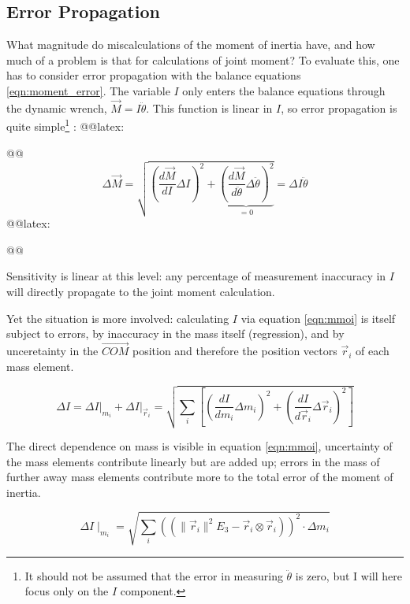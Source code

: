 \subsection{Error Propagation}
\label{sec:org0cb3045}
What magnitude do miscalculations of the moment of inertia have, and how much of a problem is that for calculations of joint moment?
To evaluate this, one has to consider error propagation \citep{Hughes2010,Arroyave2022,Myers2015} with the balance equations \eqref{eqn:moment_error}.
The variable \(I\) only enters the balance equations through the dynamic wrench, \(\vec{M} = I \ddot\theta\).
This function is linear in \(I\), so error propagation is quite simple\footnote{It should not be assumed that the error in measuring \(\ddot \theta\) is zero, but I will here focus only on the \(I\) component.} \citep{Normann2016}:
@@latex:\begin{change}@@
\begin{equation}\label{eqn:moment_error}
\Delta \vec{M} = \sqrt{\left(\frac{d \vec{M}}{d I}\Delta I\right)^2 + \underbrace{\left(\frac{d \vec{M}}{d \ddot \theta}\Delta \ddot \theta\right)^2}_{=0} } = \Delta I \ddot\theta
\end{equation}
@@latex:\end{change}@@


Sensitivity is linear at this level: any percentage of measurement inaccuracy in \(I\) will directly propagate to the joint moment calculation.


Yet the situation is more involved: calculating \(I\) via equation \eqref{eqn:mmoi} is itself subject to errors, by inaccuracy in the mass itself (regression), and by unceretainty in the \(\vec{COM}\) position and therefore the position vectors \(\vec{r}_{i}\) of each mass element.
\begin{change}
\[ \Delta I = \left. \Delta I \right|_{m_i} + \left. \Delta I \right|_{\vec{r}_i} = \sqrt{ \sum_{i} \left[ \left(\frac{d I}{d m_{i}} \Delta m_{i} \right)^2 + \left(\frac{d I}{d \vec{r}_{i}} \Delta \vec{r}_{i}\right)^2 \right] }\]
\end{change}


The direct dependence on mass is visible in equation \eqref{eqn:mmoi}, uncertainty of the mass elements contribute linearly but are added up; errors in the mass of further away mass elements contribute more to the total error of the moment of inertia.
\begin{change}
\[ \Delta I \mid_{m_i} = \sqrt{\sum\limits_{i}\left(\left( \lVert \vec{r}_{i} \rVert ^2 E_3 - \vec{r}_{i} \otimes \vec{r}_{i} \right)\right)^2 \cdot \Delta m_{i} }\]
\end{change}


